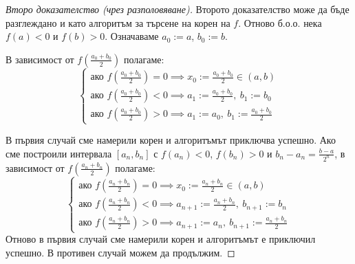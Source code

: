 \begin{proof}[Второ доказателство (чрез разполовяване)]
Второто доказателство може да бъде разглеждано и като алгоритъм за търсене на корен на $f$. Отново б.о.о. нека $f(a) < 0$ и $f(b) > 0$. Означаваме $a_0 := a$, $b_0 := b$.

В зависимост от $f\left(\frac{a_0 + b_0}{2}\right)$ полагаме:
\[
\begin{cases}
\text{ако } f\left(\frac{a_0 + b_0}{2}\right) = 0 \implies x_0 := \frac{a_0 + b_0}{2} \in (a, b) \\
\text{ако } f\left(\frac{a_0 + b_0}{2}\right) < 0 \implies a_1 := \frac{a_0 + b_0}{2},\ b_1 := b_0 \\
\text{ако } f\left(\frac{a_0 + b_0}{2}\right) > 0 \implies a_1 := a_0,\ b_1 := \frac{a_0 + b_0}{2}
\end{cases}
\]

В първия случай сме намерили корен и алгоритъмът приключва успешно. Ако сме построили интервала $[a_n, b_n]$ с $f(a_n) < 0$, $f(b_n) > 0$ и $b_n - a_n = \frac{b - a}{2^n}$, в зависимост от $f\left(\frac{a_n + b_n}{2}\right)$ полагаме:
\[
\begin{cases}
\text{ако } f\left(\frac{a_n + b_n}{2}\right) = 0 \implies x_0 := \frac{a_n + b_n}{2} \in (a, b) \\
\text{ако } f\left(\frac{a_n + b_n}{2}\right) < 0 \implies a_{n+1} := \frac{a_n + b_n}{2},\ b_{n+1} := b_n \\
\text{ако } f\left(\frac{a_n + b_n}{2}\right) > 0 \implies a_{n+1} := a_n,\ b_{n+1} := \frac{a_n + b_n}{2}
\end{cases}
\]
Отново в първия случай сме намерили корен и алгоритъмът е приключил успешно. В противен случай можем да продължим.


\end{proof}
